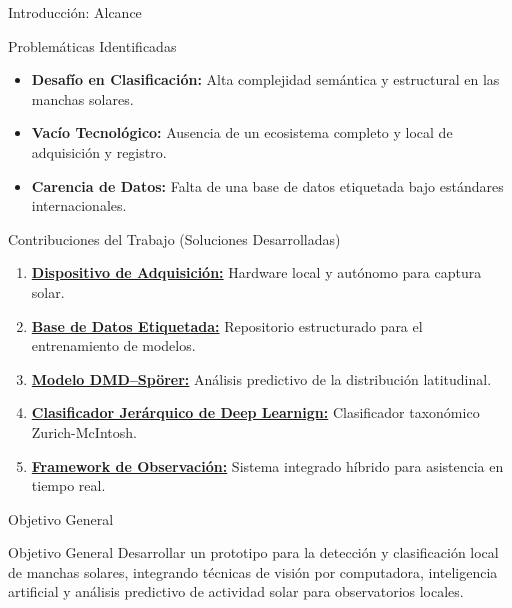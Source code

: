 \documentclass[aspectratio=169]{beamer}
\newcommand{\contrib}[1]{\textcolor{llamativoMagenta}{\textbf{\underline{#1}}}}
\begin{document}
\begin{frame}{Introducción: Alcance}
    \small
    \vspace{-0.2cm}

    \begin{block}{Problemáticas Identificadas}
        \scriptsize
        \begin{itemize}
            \item \textbf{Desafío en Clasificación:} Alta complejidad semántica y estructural en las manchas solares.
            \item \textbf{Vacío Tecnológico:} Ausencia de un ecosistema completo y local de adquisición y registro.
            \item \textbf{Carencia de Datos:} Falta de una base de datos etiquetada bajo estándares internacionales.
        \end{itemize}
    \end{block}

    \vspace{0.1cm}

    \begin{block}{Contribuciones del Trabajo (Soluciones Desarrolladas)}
        \scriptsize
        \begin{enumerate}
            \item \contrib{Dispositivo de Adquisición:} Hardware local y autónomo para captura solar.
            \item \contrib{Base de Datos Etiquetada:} Repositorio estructurado para el entrenamiento de modelos.
            \item \contrib{Modelo DMD--Spörer:} Análisis predictivo de la distribución latitudinal.
            \item \contrib{Clasificador Jerárquico de Deep Learnign:} Clasificador taxonómico Zurich-McIntosh.
            \item \contrib{Framework de Observación:} Sistema integrado híbrido para asistencia en tiempo real.
        \end{enumerate}
    \end{block}
\end{frame}


\begin{frame}{Objetivo General}
    \begin{block}{Objetivo General}
       Desarrollar un prototipo para la detección y clasificación local de manchas solares, integrando técnicas de visión por computadora, inteligencia artificial y análisis predictivo de actividad solar para observatorios locales.
    \end{block}
\end{frame}
\end{document}

